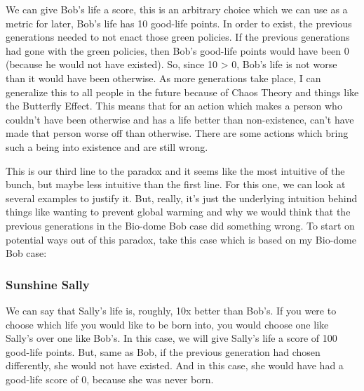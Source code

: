 We can give Bob's life a score, this is an arbitrary choice which we can use as a metric for later, Bob's life has 10 good-life points. In order to exist, the previous generations needed to not enact those green policies. If the previous generations had gone with the green policies, then Bob's good-life points would have been 0 (because he would not have existed). So, since 10 > 0, Bob's life is not worse than it would have been otherwise. As more generations take place, I can generalize this to all people in the future because of Chaos Theory and things like the Butterfly Effect. This means that for an action which makes a person who couldn't have been otherwise and has a life better than non-existence, can't have made that person worse off than otherwise. 
There are some actions which bring such a being into existence and are still wrong.

This is our third line to the paradox and it seems like the most intuitive of the bunch, but maybe less intuitive than the first line. For this one, we can look at several examples to justify it. But, really, it's just the underlying intuition behind things like wanting to prevent global warming and why we would think that the previous generations in the Bio-dome Bob case did something wrong. To start on potential ways out of this paradox, take this case which is based on my Bio-dome Bob case:
\subsubsection{Sunshine Sally}


We can say that Sally's life is, roughly, 10x better than Bob's. If you were to choose which life you would like to be born into, you would choose one like Sally's over one like Bob's. In this case, we will give Sally's life a score of 100 good-life points. But, same as Bob, if the previous generation had chosen differently, she would not have existed. And in this case, she would have had a good-life score of 0, because she was never born. 

